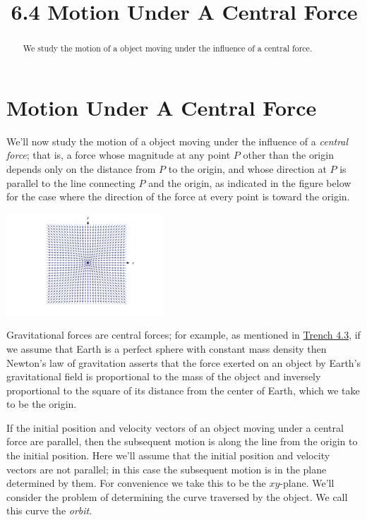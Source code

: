 \documentclass{ximera}
\title{6.4 Motion Under A Central Force}%
\begin{document}
\begin{abstract}
We study the motion of a object moving under the influence
of a central force.
\end{abstract}

\maketitle

\section*{Motion Under A Central Force}

We'll now study the motion of a object moving under the influence
of a \textit{central force}; that is, a force whose magnitude at any
point $P$ other than the origin depends only on the distance from
$P$ to the origin, and whose direction at $P$ is parallel to the line
connecting $P$ and the origin, as indicated in
the figure below for the case where the direction of the force
at every point is toward the origin.

\begin{image}
 \includegraphics[height=1.5in]{fig060401.jpg}
 \end{image}

 Gravitational forces are central
forces;   for example, as mentioned in \href{https://ximera.osu.edu/ode/main/secondLawOfMotion/secondLawOfMotion}{Trench 4.3}, if we
assume that Earth is a perfect sphere with constant mass density then
Newton's law of gravitation asserts that the force exerted on an
object by Earth's gravitational field is proportional to the mass of
the object and inversely proportional to the square of its distance
from the center of Earth, which we take to be the origin.

If the initial position and velocity vectors of an object moving under
a central force are parallel, then the subsequent motion is along the
line from the origin to the initial position. Here we'll assume that
the initial position and velocity vectors are not parallel;   in this
case the subsequent motion is in the plane determined by them. For
convenience we take this to be the $xy$-plane. We'll
consider
the problem of determining the curve traversed by the object. We call
this curve the \textit{orbit}.
\end{document}
